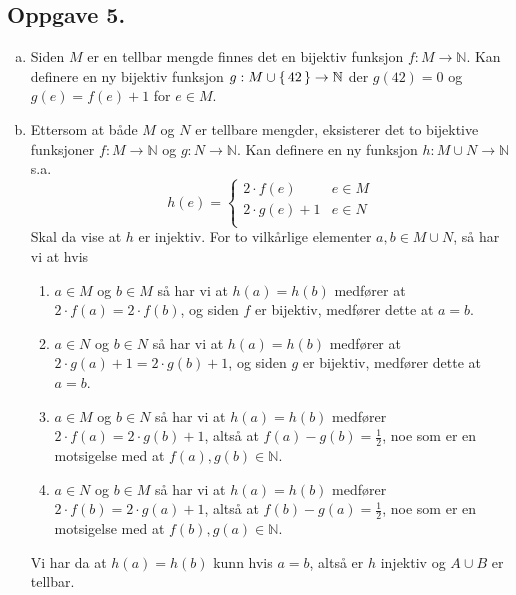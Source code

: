 \documentclass{article}
\begin{document}
\subsection*{Oppgave 5.}
\begin{enumerate}[(a)]
	\item {
		Siden $M$ er en tellbar mengde finnes det en bijektiv funksjon $f : M \to \mathbb{N}$. Kan definere 
		en ny bijektiv funksjon $g : M \cup \set{42} \to \mathbb{N}$ der $g(42) = 0$ og $g(e) = f(e) + 1$ for $e \in M$.
	}
	\item {
		Ettersom at både $M$ og $N$ er tellbare mengder, eksisterer det to bijektive funksjoner $f : M \to \mathbb{N}$ og 
		$g : N \to \mathbb{N}$. Kan definere en ny funksjon $h : M \cup N \to \mathbb{N}$ s.a.
		$$h(e) = 
		\begin{cases}
			2 \cdot f(e) & e \in M \\
			2 \cdot g(e) + 1 & e \in N \\	
		\end{cases}$$
		Skal da vise at $h$ er injektiv. For to vilkårlige elementer $a, b \in M \cup N$,
		så har vi at hvis
		\begin{enumerate}[1.]
			\item {
				$a \in M$ og $b \in M$ så har vi at $h(a) = h(b)$ medfører at $2 \cdot f(a) = 2 \cdot f(b)$, og siden 
				$f$ er bijektiv, medfører dette at $a = b$.
			}
			\item {
				$a \in N$ og $b \in N$ så har vi at $h(a) = h(b)$ medfører at $2 \cdot g(a) + 1 = 2 \cdot g(b) + 1$, og siden 
				$g$ er bijektiv, medfører dette at $a = b$.
			}
			\item {
				$a \in M$ og $b \in N$ så har vi at $h(a) = h(b)$ medfører $2 \cdot f(a) = 2 \cdot g(b) + 1$, altså at 
				$f(a) - g(b)= \frac{1}{2}$, noe som er en motsigelse med at $f(a), g(b) \in \mathbb{N}$.
			}
			\item {
				$a \in N$ og $b \in M$ så har vi at $h(a) = h(b)$ medfører $2 \cdot f(b) = 2 \cdot g(a) + 1$, altså at 
				$f(b) - g(a)= \frac{1}{2}$, noe som er en motsigelse med at $f(b), g(a) \in \mathbb{N}$.
			}
		\end{enumerate}
		Vi har da at $h(a) = h(b)$ kunn hvis $a = b$, altså er $h$ injektiv og $A \cup B$ er tellbar.
	}
\end{enumerate}
\end{document}
